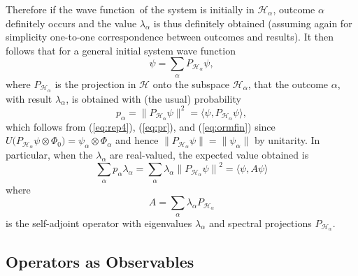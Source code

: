 \documentclass[12pt]{article}
\newcommand{\eq}[1]{(\ref{#1})}
\newcommand{\sa}{self-adjoint}
\newcommand{\wf}{wave function}
\renewcommand{\a}{\alpha}
\newcommand{\la}{\lambda_{\a}}
\newcommand{\suma}{\sum_{\a }}
\newcommand{\ot}{\otimes}
\newcommand{\psia}{\psi_{\a}}
\newcommand{\Phia}{\Phi_{\a}}
\newcommand{\Ha}{{\H}_{\a}}
\renewcommand{\H}{\mbox{$\mathcal{H}$}}
\newcommand{\Pa}{ P_{ {\mathcal{H}_{\a} } } }
\begin{document}
Therefore if the \wf\ of the system is initially in $\H_\a$, outcome
$\a$ definitely occurs and the value $\lambda_\a$ is thus definitely
obtained (assuming again for simplicity one-to-one correspondence
between outcomes and results).  It then follows that for a general
initial system \wf
%
\begin{displaymath}
\psi =\suma \Pa \psi ,
\end{displaymath}
%
where $\Pa$ is the projection in $\H$ onto the subspace $\Ha$, that
the outcome $\a$, with result $\la$, is obtained with (the usual)
probability
%
\begin{equation}
p_\a = \| \Pa\psi\|^2= \langle\psi,\Pa \psi \rangle,
\label{eq:prr}
\end{equation}
%
which follows {}from (\ref{eq:rep4}), \eq{eq:pr}, and \eq{eq:ormfin}
since $U\big(\Pa\psi\ot\Phi_0\big) = \psia \ot\Phia$ and hence $ \|
\Pa\psi\| = \| \psia \|$ by unitarity.  In particular, when the $\la$
are real-valued, the expected value obtained is
%
\begin{equation}
\suma{p_\a \la}=\suma{\la{ \| \Pa \psi\|}^2} = \langle
\psi, A\psi \rangle \label{eq:meanz}
\end{equation}
%
where
%
\begin{equation}
A=\suma{\la \Pa}
\label{eq:A}
\end{equation}
is the \sa{} operator with eigenvalues $\la$ and spectral projections
$\Pa$.

\subsection{Operators as Observables}\label{subsec.oao}
\end{document}
